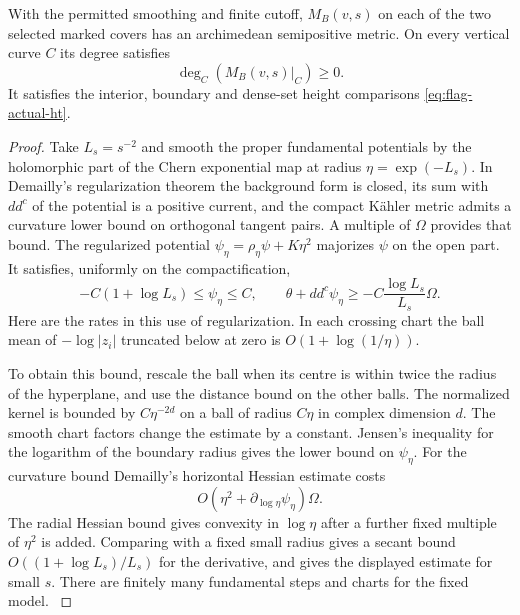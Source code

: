 \begin{proposition}
\label{prop:perturbed-flag-metric}
With the permitted smoothing and finite cutoff, \(M_B(v,s)\)
on each of the two selected marked covers has an archimedean semipositive metric. On every vertical curve \(C\) its degree satisfies
\[
 \deg_C(M_B(v,s)|_C)\ge0.
\]
 It satisfies the interior, boundary and dense-set
height comparisons \eqref{eq:flag-actual-ht}.
\end{proposition}

\begin{proof}
Take \(L_s=s^{-2}\) and smooth the proper fundamental potentials by
the holomorphic part of the Chern exponential map at radius
\(\eta=\exp(-L_s)\). In Demailly's regularization theorem the
background form is closed, its sum with \(dd^c\) of the potential
is a positive current, and the compact Kähler metric admits a
curvature lower bound on orthogonal tangent pairs. A multiple of
\(\Omega\) provides that bound. The regularized potential
\(\psi_\eta=\rho_\eta\psi+K\eta^2\) majorizes \(\psi\) on the
open part. It satisfies, uniformly on the compactification,
\[
 -C(1+\log L_s)\le\psi_\eta\le C,\qquad
 \theta+dd^c\psi_\eta\ge -C\frac{\log L_s}{L_s}\Omega .
\]
Here are the rates in this use of regularization. In each crossing
chart the ball mean of \(-\log |z_i|\) truncated below at zero is
\(O(1+\log(1/\eta))\).

To obtain this bound, rescale the ball when its centre is within
twice the radius of the hyperplane, and use the distance bound
on the other balls. The normalized kernel is bounded by
\(C\eta^{-2d}\) on a ball of radius \(C\eta\) in complex
dimension \(d\). The smooth chart factors change the estimate by
a constant. Jensen's inequality for the logarithm of the boundary
radius gives the lower bound on \(\psi_\eta\). For the curvature
bound Demailly's horizontal Hessian estimate costs
\[
 O(\eta^2+\partial_{\log\eta}\psi_\eta)\Omega.
\]
The radial
Hessian bound gives convexity in \(\log\eta\) after a further
fixed multiple of \(\eta^2\) is added. Comparing with a fixed
small radius gives a secant bound \(O((1+\log L_s)/L_s)\) for
the derivative, and gives the displayed estimate for small \(s\).
There are finitely many fundamental steps and charts for the fixed
model. \cite{demailly-flag}\label{cor:flag-wall-positivity-2}


\end{proof}
